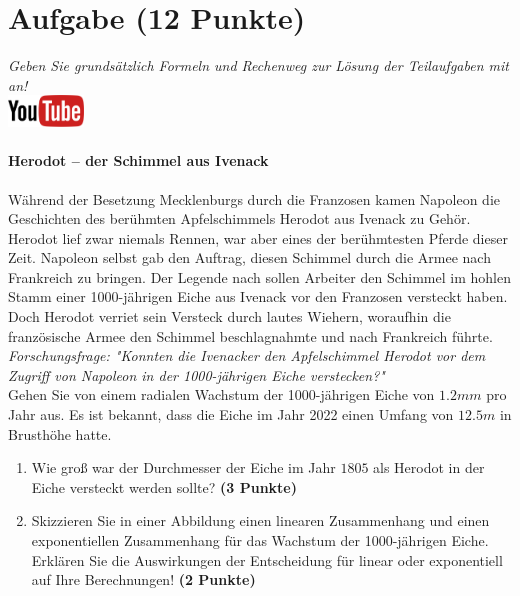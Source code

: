 \documentclass[a4paper, 9pt]{scrartcl}\usepackage[]{graphicx}\usepackage[]{xcolor}
\begin{document}
\section{Aufgabe \hfill (12 Punkte)}

\textit{Geben Sie grunds{\"a}tzlich Formeln und Rechenweg zur L{\"o}sung der
  Teilaufgaben mit an!} \\[1Ex]

\hfill\href{https://youtu.be/Fu8kN0Uj13Y}{\includegraphics[width =
  2cm]{img/youtube}} %
\hspace{2Ex}

\paragraph{Herodot – der Schimmel aus Ivenack}

W{\"a}hrend der Besetzung Mecklenburgs durch die Franzosen kamen Napoleon die
Geschichten des ber{\"u}hmten Apfelschimmels Herodot aus Ivenack zu
Geh{\"o}r. Herodot lief zwar niemals Rennen, war aber eines der ber{\"u}hmtesten
Pferde dieser Zeit. Napoleon selbst gab den Auftrag, diesen
Schimmel durch die Armee nach Frankreich zu bringen. Der Legende nach
sollen Arbeiter den Schimmel im hohlen Stamm einer 1000-j{\"a}hrigen Eiche aus Ivenack vor
den Franzosen versteckt haben. Doch Herodot verriet sein Versteck durch
lautes Wiehern, woraufhin die franz{\"o}sische Armee den Schimmel
beschlagnahmte und nach Frankreich f{\"u}hrte. \\



\textit{Forschungsfrage: "Konnten die Ivenacker den Apfelschimmel Herodot
  vor dem Zugriff von Napoleon in der 1000-j{\"a}hrigen Eiche verstecken?"} \\

Gehen Sie von einem radialen Wachstum der 1000-j{\"a}hrigen Eiche von
$1.2mm$ pro Jahr aus. Es ist bekannt, dass die Eiche im
Jahr 2022 einen Umfang von $12.5m$ in Brusth{\"o}he hatte.

\begin{enumerate}
\item Wie gro{\ss} war der Durchmesser der Eiche im Jahr $1805$ als
  Herodot in der Eiche versteckt werden sollte?
  \textbf{(3 Punkte)}
\item Skizzieren Sie in einer Abbildung einen linearen Zusammenhang und einen
exponentiellen Zusammenhang f{\"u}r das Wachstum der 1000-j{\"a}hrigen Eiche. Erkl{\"a}ren Sie die
Auswirkungen der Entscheidung f{\"u}r linear oder exponentiell auf Ihre
Berechnungen! \textbf{(2 Punkte)}
\end{enumerate}
 
\end{document}
